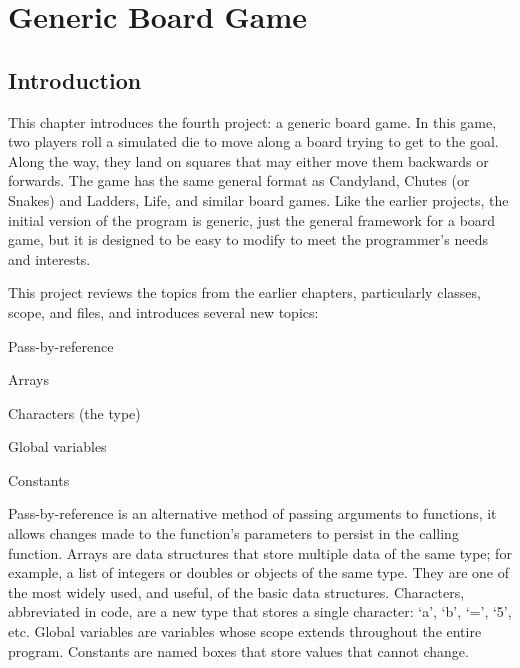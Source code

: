 
\chapter{Generic Board Game}\label{ch:boardgame}

\section{Introduction}

This chapter introduces the fourth project: a generic board game.  In this game, two players roll a simulated die to move along a board trying to get to the goal.  Along the way, they land on squares that may either move them backwards or forwards.  The game has the same general format as  Candyland{\texttrademark}, Chutes (or Snakes) and Ladders{\texttrademark}, Life{\texttrademark}, and similar board games.  Like the earlier projects, the initial version of the program is generic, just the general framework for a board game, but it is designed to be easy to modify to meet the programmer's needs and interests.

This project reviews the topics from the earlier chapters, particularly classes, scope, and files, and introduces several new topics:
\begin{tight_itemize}
\item Pass-by-reference
  \item Arrays
  \item Characters (the  type)
  \item Global variables
   \item Constants
\end{tight_itemize}

 Pass-by-reference is an alternative method of passing arguments to functions, it allows changes made to the function's parameters to persist in the calling function.  Arrays are data structures that store multiple data of the same type; for example, a list of integers or doubles or objects of the same type.  They are one of the most widely used, and useful, of the basic data structures.  Characters, abbreviated  in code, are a new type that stores a single character: `a', `b', `=', `5', etc.  Global variables are variables whose scope extends throughout the entire program.   Constants are named boxes that store values that cannot change.

